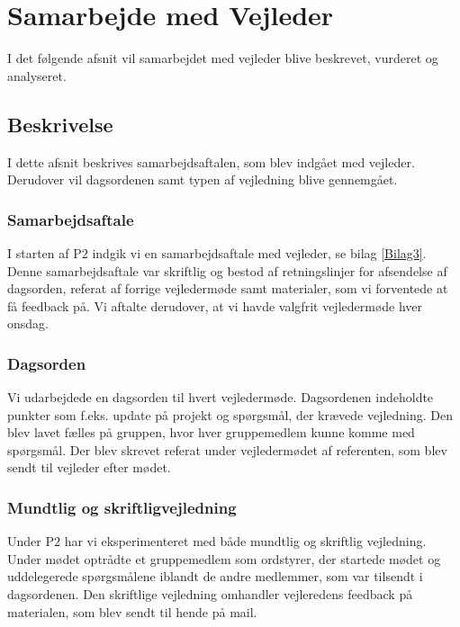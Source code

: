 \chapter{Samarbejde med Vejleder}
I det følgende afsnit vil samarbejdet med vejleder blive beskrevet, vurderet og analyseret. 

\section{Beskrivelse}
I dette afsnit beskrives samarbejdsaftalen, som blev indgået med vejleder. Derudover vil dagsordenen samt typen af vejledning blive gennemgået.

\subsection{Samarbejdsaftale}
I starten af P$2$ indgik vi en samarbejdsaftale med vejleder, se bilag \ref{Bilag3}. Denne samarbejdsaftale var skriftlig og bestod af retningslinjer for afsendelse af dagsorden, referat af forrige vejledermøde samt materialer, som vi forventede at få feedback på. Vi aftalte derudover, at vi havde valgfrit vejledermøde hver onsdag.

\subsection{Dagsorden}
Vi udarbejdede en dagsorden til hvert vejledermøde. Dagsordenen indeholdte punkter som f.eks. update på projekt og spørgsmål, der krævede vejledning. Den blev lavet fælles på gruppen, hvor hver gruppemedlem kunne komme med spørgsmål. Der blev skrevet referat under vejledermødet af referenten, som blev sendt til vejleder efter mødet.

\subsection{Mundtlig og skriftligvejledning}
Under P$2$ har vi eksperimenteret med både mundtlig og skriftlig vejledning. Under mødet optrådte et gruppemedlem som ordstyrer, der startede mødet og uddelegerede spørgsmålene iblandt de andre medlemmer, som var tilsendt i dagsordenen. Den skriftlige vejledning omhandler vejleredens feedback på materialen, som blev sendt til hende på mail.

